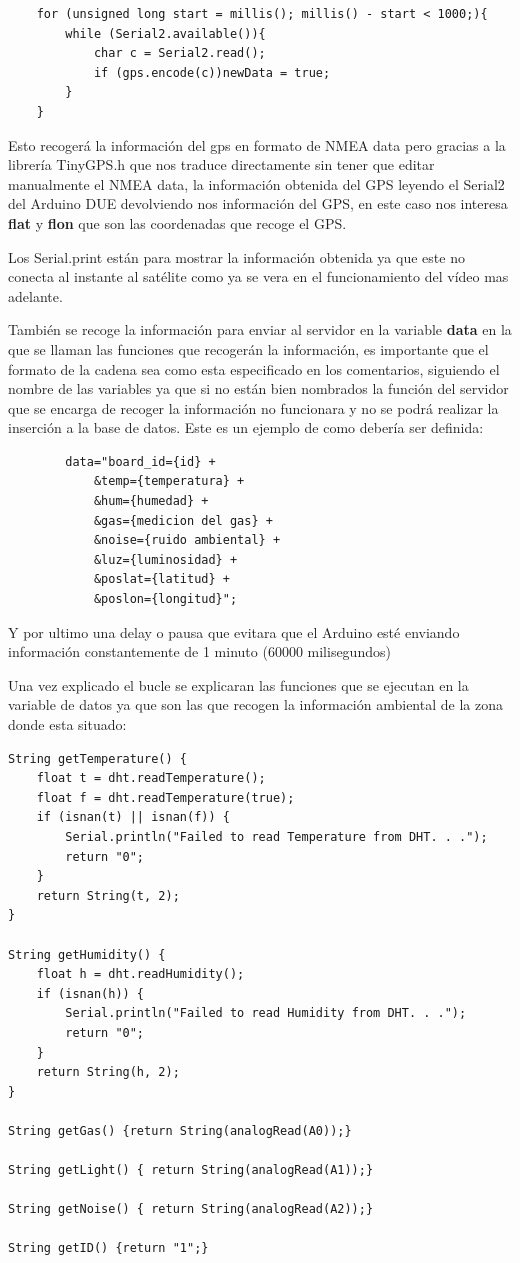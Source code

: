 \begin{lstlisting}
	for (unsigned long start = millis(); millis() - start < 1000;){
		while (Serial2.available()){
			char c = Serial2.read();
			if (gps.encode(c))newData = true;
		}
	}
\end{lstlisting}

Esto recogerá la información del gps en formato de NMEA data pero gracias a la librería TinyGPS.h que nos traduce directamente sin tener que editar manualmente el NMEA data, la información obtenida del GPS leyendo el Serial2 del Arduino DUE devolviendo nos información del GPS, en este caso nos interesa \textbf{flat} y \textbf{flon} que son las coordenadas que recoge el GPS.

 Los Serial.print están para mostrar la información obtenida ya que este no conecta al instante al satélite como ya se vera en el funcionamiento del vídeo mas adelante.

También se recoge la información para enviar al servidor en la variable \textbf{data} en la que se llaman las funciones que recogerán la información, es importante que el formato de la cadena sea como esta especificado en los comentarios, siguiendo el nombre de las variables ya que si no están bien nombrados la función del servidor que se encarga de recoger la información no funcionara y no se podrá realizar la inserción a la base de datos. Este es un ejemplo de como debería ser definida:\\

\begin{lstlisting}
		data="board_id={id} +
			&temp={temperatura} +
			&hum={humedad} +
			&gas={medicion del gas} +
			&noise={ruido ambiental} +
			&luz={luminosidad} +
			&poslat={latitud} +
			&poslon={longitud}";
\end{lstlisting}

Y por ultimo una delay o pausa que evitara que el Arduino esté enviando información constantemente de 1 minuto (60000 milisegundos)

Una vez explicado el bucle se explicaran las funciones que se ejecutan en la variable de datos ya que son las que recogen la información ambiental de la zona donde esta situado:\\

\begin{lstlisting}
String getTemperature() {
	float t = dht.readTemperature();
	float f = dht.readTemperature(true);
	if (isnan(t) || isnan(f)) {
		Serial.println("Failed to read Temperature from DHT. . .");
		return "0";
	}
	return String(t, 2);
}

String getHumidity() {
	float h = dht.readHumidity();
	if (isnan(h)) {
		Serial.println("Failed to read Humidity from DHT. . .");
		return "0";
	}
	return String(h, 2);
}

String getGas() {return String(analogRead(A0));}

String getLight() {	return String(analogRead(A1));}

String getNoise() {	return String(analogRead(A2));}

String getID() {return "1";}
\end{lstlisting}

